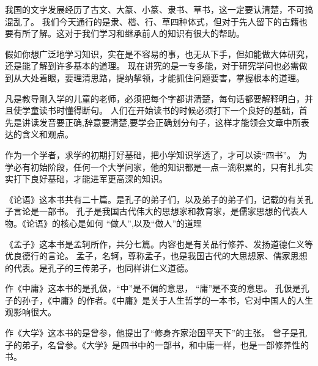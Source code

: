 \documentclass[avery5371,grid]{flashcards}
\begin{document}
{我国的文字发展经历了古文、大篆、小篆、隶书、草书，这一定要认清楚，不可搞混乱了。} %
{我们今天通行的是隶、楷、行、草四种体式，但对于先人留下的古籍也要有所了解。这对于我们学习和继承前人的知识有很大的帮助。} %

{假如你想广泛地学习知识，实在是不容易的事，也无从下手，但如能做大体研究，还是能了解到许多基本的道理。} %
{现在讲究的是一专多能，对于研究学问也必需做到从大处着眼，要理清思路，提纳挈领，才能抓住问题要害，掌握根本的道理。} %



{凡是教导刚入学的儿童的老师，必须把每个字都讲清楚，每句话都要解释明白，并且使学童读书时懂得断句。} %
{人们在开始读书的时候必须打下一个良好的基础，首先是讲读发音要正确,辞意要清楚,要学会正确划分句子，这样才能领会文章中所表达的含义和观点。} %

{作为一个学者，求学的初期打好基础，把小学知识学透了，才可以读“四书”。} %
{为学必有初始阶段，任何一个大学问家，他的知识都是一点一滴积累的，只有扎扎实实打下良好基础，才能进军更高深的知识。} %

{《论语》这本书共有二十篇。是孔子的弟子们，以及弟子的弟子们，记载的有关孔子言论是一部书。} %
{孔子是我国古代伟大的思想家和教育家，是儒家思想的代表人物。《论语》的核心是如何 “做人”,以及“做人”的道理} %

{《孟子》这本书是孟轲所作，共分七篇。内容也是有关品行修养、发扬道德仁义等优良德行的言论。} %
{孟子，名轲，尊称孟子，也是我国古代的大思想家、儒家思想的代表。是孔子的三传弟子，也同样讲仁义道德。} %

{作《中庸》这本书的是孔伋，“中”是不偏的意思， “庸”是不变的意思。} %
{孔伋是孔子的孙子，《中庸》的作者。《中庸》是关于人生哲学的一本书，它对中国人的人生观影响很大。} %

{作《大学》这本书的是曾参，他提出了“修身齐家治国平天下”的主张。} %
{曾子是孔子的弟子，名曾参。《大学》是四书中的一部书，和中庸一样，也是一部修养性的书。} %
\end{document}
